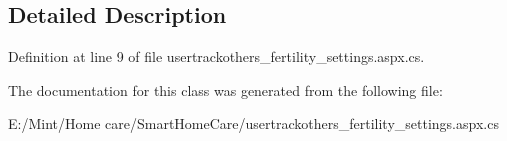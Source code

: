 \subsection{Detailed Description}


Definition at line 9 of file usertrackothers\-\_\-fertility\-\_\-settings.\-aspx.\-cs.



The documentation for this class was generated from the following file\-:\begin{DoxyCompactItemize}
\item 
E\-:/\-Mint/\-Home care/\-Smart\-Home\-Care/usertrackothers\-\_\-fertility\-\_\-settings.\-aspx.\-cs\end{DoxyCompactItemize}
